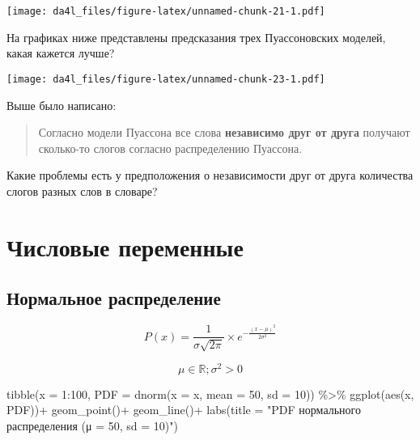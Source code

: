 \documentclass[
]{book}
\makeatletter
\newenvironment{Shaded}{\begin{snugshade}}{\end{snugshade}}
\newcommand{\AttributeTok}[1]{\textcolor[rgb]{0.77,0.63,0.00}{#1}}
\newcommand{\DecValTok}[1]{\textcolor[rgb]{0.00,0.00,0.81}{#1}}
\newcommand{\FunctionTok}[1]{\textcolor[rgb]{0.00,0.00,0.00}{#1}}
\newcommand{\NormalTok}[1]{#1}
\newcommand{\SpecialCharTok}[1]{\textcolor[rgb]{0.00,0.00,0.00}{#1}}
\newcommand{\StringTok}[1]{\textcolor[rgb]{0.31,0.60,0.02}{#1}}
\newenvironment{kframe}{%
    \medskip{}
    \setlength{\fboxsep}{.8em}
    \def\at@end@of@kframe{}%
    \ifinner\ifhmode%
    \def\at@end@of@kframe{\end{minipage}}%
    \begin{minipage}{\columnwidth}%
    \fi\fi%
    \def\FrameCommand##1{\hskip\@totalleftmargin \hskip-\fboxsep
    \colorbox{shadecolor}{##1}\hskip-\fboxsep
        \hskip-\linewidth \hskip-\@totalleftmargin \hskip\columnwidth}%
    \MakeFramed {\advance\hsize-\width
      \@totalleftmargin\z@ \linewidth\hsize
      \@setminipage}}%
  {\par\unskip\endMakeFramed%
    \at@end@of@kframe}
\newenvironment{rmdblock}[1]
  {
    \begin{itemize}
    \renewcommand{\labelitemi}{
      \raisebox{-.7\height}[0pt][0pt]{
        {\setkeys{Gin}{width=3em,keepaspectratio}\texttt{[image: images/\#1]}}
        }
        }
        \setlength{\fboxsep}{1em}
        \begin{kframe}
        \item
      }
      {
        \end{kframe}
        \end{itemize}
      }
\newenvironment{rmdtask}
      {\begin{rmdblock}{task}}
      {\end{rmdblock}}
\makeatother
\begin{document}
\texttt{[image: da4l\_files/figure-latex/unnamed-chunk-21-1.pdf]}

\begin{rmdtask}
На графиках ниже представлены предсказания трех Пуассоновских моделей,
какая кажется лучше?
\end{rmdtask}

\texttt{[image: da4l\_files/figure-latex/unnamed-chunk-23-1.pdf]}

\begin{rmdtask}
Выше было написано:

\begin{quote}
Согласно модели Пуассона все слова \textbf{независимо друг от друга}
получают сколько-то слогов согласно распределению Пуассона.
\end{quote}

Какие проблемы есть у предположения о независимости друг от друга
количества слогов разных слов в словаре?
\end{rmdtask}

\hypertarget{ux447ux438ux441ux43bux43eux432ux44bux435-ux43fux435ux440ux435ux43cux435ux43dux43dux44bux435}{%
\section{Числовые переменные}\label{ux447ux438ux441ux43bux43eux432ux44bux435-ux43fux435ux440ux435ux43cux435ux43dux43dux44bux435}}

\hypertarget{ux43dux43eux440ux43cux430ux43bux44cux43dux43eux435-ux440ux430ux441ux43fux440ux435ux434ux435ux43bux435ux43dux438ux435}{%
\subsection{Нормальное распределение}\label{ux43dux43eux440ux43cux430ux43bux44cux43dux43eux435-ux440ux430ux441ux43fux440ux435ux434ux435ux43bux435ux43dux438ux435}}

\[P(x) = \frac{1}{\sigma\sqrt{2\pi}}\times e^{-\frac{\left(x-\mu\right)^2}{2\sigma^2}}\]

\[\mu \in \mathbb{R}; \sigma^2 > 0\]

\begin{Shaded}
\begin{Highlighting}[]
\FunctionTok{tibble}\NormalTok{(}\AttributeTok{x =} \DecValTok{1}\SpecialCharTok{:}\DecValTok{100}\NormalTok{,}
       \AttributeTok{PDF =} \FunctionTok{dnorm}\NormalTok{(}\AttributeTok{x =}\NormalTok{ x, }\AttributeTok{mean =} \DecValTok{50}\NormalTok{, }\AttributeTok{sd =} \DecValTok{10}\NormalTok{)) }\SpecialCharTok{\%\textgreater{}\%} 
  \FunctionTok{ggplot}\NormalTok{(}\FunctionTok{aes}\NormalTok{(x, PDF))}\SpecialCharTok{+}
  \FunctionTok{geom\_point}\NormalTok{()}\SpecialCharTok{+}
  \FunctionTok{geom\_line}\NormalTok{()}\SpecialCharTok{+}
  \FunctionTok{labs}\NormalTok{(}\AttributeTok{title =} \StringTok{"PDF нормального распределения (μ = 50, sd = 10)"}\NormalTok{)}
\end{Highlighting}
\end{Shaded}
\end{document}
